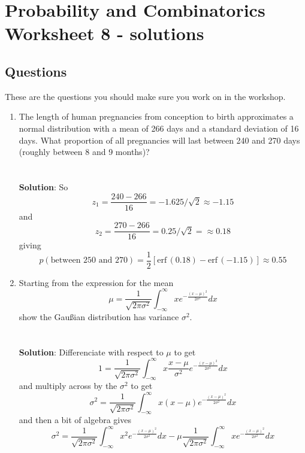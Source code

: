 \documentclass[11pt,a4paper]{scrartcl}
\begin{document}
\section*{Probability and Combinatorics Worksheet 8 - solutions}


\subsection*{Questions}

These are the questions you should make sure you work on in the workshop.

\begin{enumerate}


\item The length of human pregnancies from conception to birth
  approximates a normal distribution with a mean of 266 days and a
  standard deviation of 16 days.  What proportion of all pregnancies
  will last between 240 and 270 days (roughly between 8 and 9 months)?
\\ \\ \\
\textbf{Solution}:
So
\begin{equation}
  z_1=\frac{240-266}{16}=-1.625/\sqrt{2}\approx-1.15
\end{equation}
and
\begin{equation}
  z_2=\frac{270-266}{16}=0.25/\sqrt{2}=\approx 0.18
\end{equation}
giving
\begin{equation}
  p(\mbox{between 250 and 270})=\frac{1}{2}[\mbox{erf}\,(0.18)-\mbox{erf}\,(-1.15)]\approx 0.55
\end{equation}


\item Starting from the expression for the mean
  \begin{equation}
    \mu=\frac{1}{\sqrt{2\pi\sigma^2}}\int_{-\infty}^\infty xe^{-\frac{(x-\mu)^2}{2\sigma^2}}dx
  \end{equation}
  show the Gau\ss{}ian distribution has variance $\sigma^2$.
\\ \\ \\
\textbf{Solution}: Differenciate with respect to $\mu$ to get
\begin{equation}
  1=\frac{1}{\sqrt{2\pi\sigma^2}}\int_{-\infty}^\infty x\frac{x-\mu}{\sigma^2}e^{-\frac{(x-\mu)^2}{2\sigma^2}}dx
\end{equation}
and multiply across by the $\sigma^2$ to get
\begin{equation}
  \sigma^2=\frac{1}{\sqrt{2\pi\sigma^2}}\int_{-\infty}^\infty x(x-\mu)e^{-\frac{(x-\mu)^2}{2\sigma^2}}dx
\end{equation}
and then a bit of algebra gives
\begin{equation}
  \sigma^2=\frac{1}{\sqrt{2\pi\sigma^2}}\int_{-\infty}^\infty x^2e^{-\frac{(x-\mu)^2}{2\sigma^2}}dx-\mu\frac{1}{\sqrt{2\pi\sigma^2}}\int_{-\infty}^\infty xe^{-\frac{(x-\mu)^2}{2\sigma^2}}dx
\end{equation}


\end{enumerate}
\end{document}
